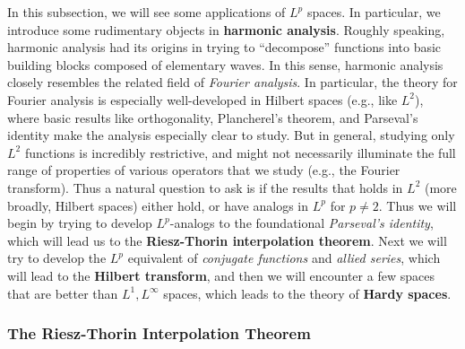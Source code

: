 \documentclass{article}
\begin{document}
In this subsection, we will see some applications of $L^{p}$ spaces. In particular, we introduce some rudimentary objects in \textbf{harmonic analysis}. Roughly speaking, harmonic analysis had its origins in trying to ``decompose'' functions into basic building blocks composed of elementary waves. In this sense, harmonic analysis closely resembles the related field of \textit{Fourier analysis}. In particular, the theory for Fourier analysis is especially well-developed in Hilbert spaces (e.g., like $L^{2}$), where basic results like orthogonality, Plancherel's theorem, and Parseval's identity make the analysis especially clear to study. But in general, studying only $L^{2}$ functions is incredibly restrictive, and might not necessarily illuminate the full range of properties of various operators that we study (e.g., the Fourier transform). Thus a natural question to ask is if the results that holds in $L^{2}$ (more broadly, Hilbert spaces) either hold, or have analogs in $L^{p}$ for $p \neq 2$. Thus we will begin by trying to develop $L^{p}$-analogs to the foundational \textit{Parseval's identity}, which will lead us to the \textbf{Riesz-Thorin interpolation theorem}. Next we will try to develop the $L^{p}$ equivalent of \textit{conjugate functions} and \textit{allied series}, which will lead to the \textbf{Hilbert transform}, and then we will encounter a few spaces that are better than $L^{1}, L^{\infty}$ spaces, which leads to the theory of \textbf{Hardy spaces}. 

\subsubsection{The Riesz-Thorin Interpolation Theorem} 
\end{document}
